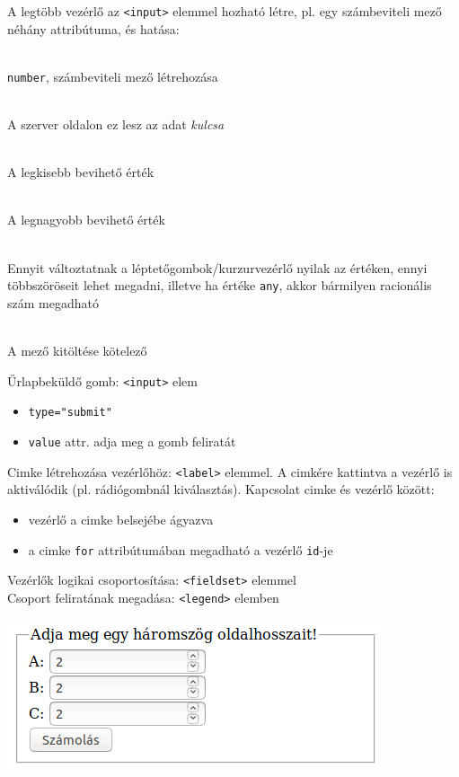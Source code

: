 \begin{frame}
  A legtöbb vezérlő az \texttt{<input>} elemmel hozható létre, pl. 
  egy számbeviteli mező néhány attribútuma, és hatása:
  \begin{description}[m]
    \footnotesize
    \item[\texttt{type}] \hfill \\ \texttt{number}, számbeviteli mező 
    létrehozása
    \item[\texttt{name}] \hfill \\ A szerver oldalon ez lesz az adat 
    \emph{kulcsa}
    \item[\texttt{min}] \hfill \\ A legkisebb bevihető érték
    \item[\texttt{max}] \hfill \\ A legnagyobb bevihető érték
    \item[\texttt{step}] \hfill \\ Ennyit változtatnak a 
    léptetőgombok/kurzurvezérlő nyilak az értéken, ennyi 
    többszöröseit lehet megadni, illetve ha 
    értéke \texttt{any}, akkor bármilyen racionális szám megadható
    \item[\texttt{required}] \hfill \\ A mező kitöltése kötelező
  \end{description}
\end{frame}

\begin{frame}
  Űrlapbeküldő gomb: \texttt{<input>} elem
  \begin{itemize}
    \item \texttt{type="submit"}
    \item \texttt{value} attr. adja meg a gomb feliratát
  \end{itemize}
  \vfill
  Cimke létrehozása vezérlőhöz: \texttt{<label>} elemmel. A 
  cimkére kattintva a vezérlő is aktiválódik (pl. rádiógombnál 
  kiválasztás). Kapcsolat cimke és 
  vezérlő között:
  \begin{itemize}
    \item vezérlő a cimke belsejébe ágyazva
    \item a cimke \texttt{for} attribútumában megadható a vezérlő 
    \texttt{id}-je
  \end{itemize}
\end{frame}

\begin{frame}
  Vezérlők logikai csoportosítása: \texttt{<fieldset>} elemmel\\
  Csoport feliratának megadása: \texttt{<legend>} elemben
  \vfill
  \begin{center}
    \includegraphics[width=.5\textwidth]{urlap1.png}
  \end{center}
\end{frame}


